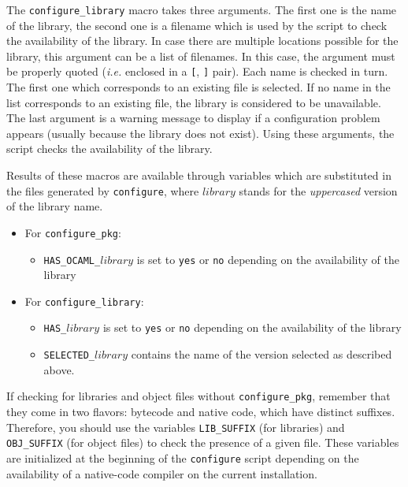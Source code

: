 The \texttt{configure\_library} macro takes three arguments. The first one is
the name of the library, the second one is a filename
which is used by the script to check the availability of the library.
In case there are multiple locations possible for the library, this
argument can be a list of filenames. In this case, the argument must
be properly quoted ({\it i.e.} enclosed in a {\tt [}, {\tt]} pair).
Each name is checked in turn. The first one which corresponds to an
existing file is selected.  If no name in the list corresponds to an
existing file, the library is considered to be unavailable. The last
argument is a warning message to display if a configuration problem
appears (usually because the library does not exist). Using these
arguments, the script checks the availability of the library.

Results of these macros are available through variables which are
substituted in the files generated by \texttt{configure}, where
\texttt{$library$} stands for the \emph{uppercased}
version of the library name.
\begin{itemize}
\item For \texttt{configure\_pkg}:
\begin{itemize}
\item \texttt{HAS\_OCAML\_$library$}
is set to \texttt{yes} or \texttt{no} depending on the availability
of the library
\end{itemize}
\item For \texttt{configure\_library}:
\begin{itemize}
\item \texttt{HAS\_$library$}
  is set to \texttt{yes} or \texttt{no} depending on the availability
  of the library
\item \texttt{SELECTED\_$library$}
contains the name of the version selected as described above.
\end{itemize}
\end{itemize}

If checking for \ocaml{} libraries and object files without
\texttt{configure\_pkg}, remember that
they come in two flavors: bytecode and native
code, which have distinct suffixes. Therefore, you should use the
variables \texttt{LIB\_SUFFIX}
(for libraries) and
\texttt{OBJ\_SUFFIX}
(for object files) to check the presence of a
given file. These variables are initialized at the beginning of the
\texttt{configure} script depending on the availability of a
native-code compiler on the current installation.

